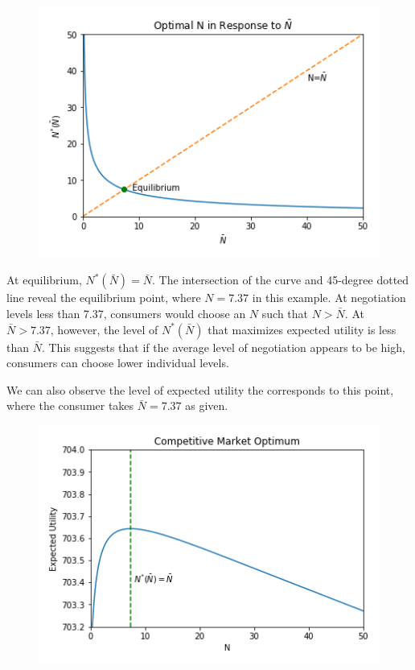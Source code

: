 \documentclass[12pt]{article}
\theoremstyle{plain}
\begin{document}
\begin{figure}[h]
\centering
\includegraphics[width=13cm]{competitive.png}
\end{figure}

At equilibrium, $N^*(\bar{N}) = \bar{N}$. The intersection of the curve and 45-degree dotted line reveal the equilibrium point, where $N=7.37$ in this example. At negotiation levels less than 7.37, consumers would choose an $N$ such that $N > \bar{N}$. At $\bar{N} > 7.37$, however, the level of $N^*(\bar{N})$ that maximizes expected utility is less than $\bar{N}$. This suggests that if the average level of negotiation appears to be high, consumers can choose lower individual levels.

We can also observe the level of expected utility the corresponds to this point, where the consumer takes $\bar{N} = 7.37$ as given.

\begin{figure}[h]
\centering
\includegraphics[width=13cm]{comp_eu.png}
\end{figure}
\end{document}
